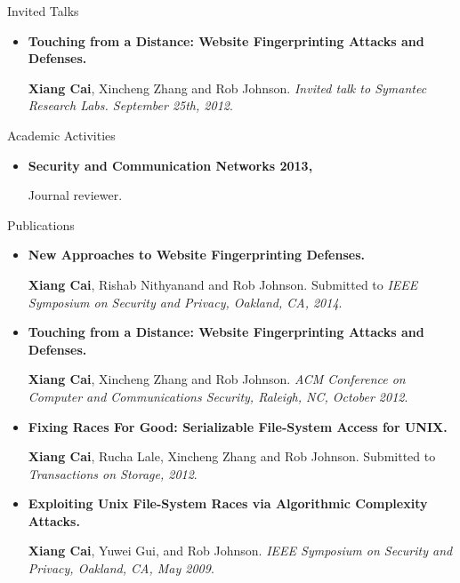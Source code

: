 \documentclass[11pt,oneside]{article}
\newenvironment{ressection}[1]{
	\vspace{4pt}
	{\fontfamily{phv}\selectfont\Large#1}
	\begin{itemize}
	\vspace{3pt}
}{
	\end{itemize}
}
\newcommand{\resitem}[1]{
	\vspace{-4pt}
	\item \begin{flushleft} #1 \end{flushleft}
}
\begin{document}
\begin{ressection}{Invited Talks}
	\resitem{\textbf{Touching from a Distance: Website Fingerprinting
		Attacks and Defenses.} \begin{small} \textbf{Xiang Cai}, Xincheng Zhang
			and Rob Johnson. \textit{Invited talk to Symantec Research Labs. September 25th, 2012}.
		\end{small}}
\end{ressection}

\begin{ressection}{Academic Activities}
	\resitem{\textbf{Security and Communication Networks 2013, } \begin{small}Journal reviewer.\end{small}
	}
\end{ressection}

\begin{ressection}{Publications}
	\resitem{\textbf{New Approaches to Website Fingerprinting Defenses.} \begin{small} \textbf{Xiang Cai}, Rishab Nithyanand
			and Rob Johnson. Submitted to \textit{IEEE Symposium on Security and Privacy,
				Oakland, CA, 2014}.
	\end{small}}

	\resitem{\textbf{Touching from a Distance: Website Fingerprinting
		Attacks and Defenses.} \begin{small} \textbf{Xiang Cai}, Xincheng Zhang
			and Rob Johnson. \textit{ACM Conference on Computer and Communications Security, Raleigh, NC, October 2012}.					\end{small}}

	\resitem{\textbf{Fixing Races For Good: Serializable File-System
		Access for UNIX.} \begin{small} \textbf{Xiang Cai}, Rucha Lale,
		Xincheng Zhang and Rob Johnson. Submitted to \textit{Transactions on Storage, 2012}.\end{small}}

	\resitem{\textbf{Exploiting Unix File-System Races via Algorithmic
		Complexity Attacks.} \begin{small} \textbf{Xiang Cai}, Yuwei Gui, and
			Rob Johnson. \textit{IEEE Symposium on Security and Privacy,
				Oakland, CA, May 2009}.\end{small}}

\end{ressection}
\end{document}
